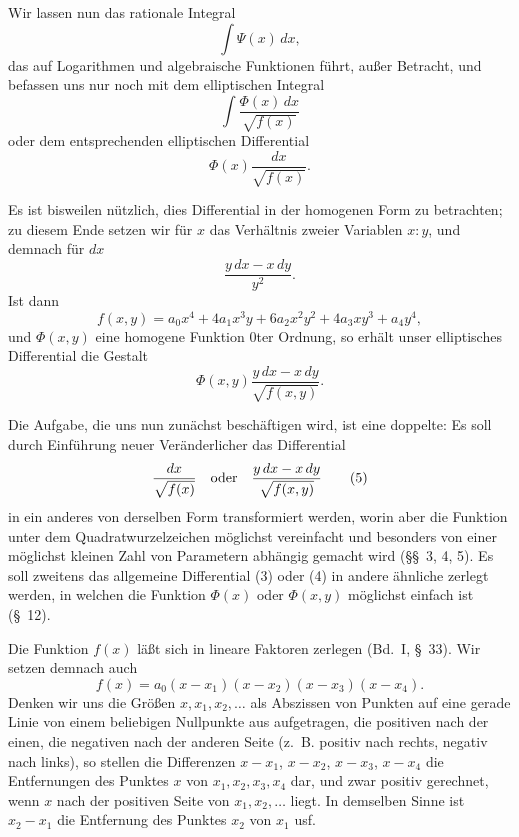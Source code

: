 \documentclass[11pt]{article}
\begin{document}
Wir lassen nun das rationale Integral
\[
\int \Psi(x)\,dx,
\]
das auf Logarithmen und algebraische Funktionen führt, außer Betracht, und befassen uns nur noch mit dem elliptischen Integral
\begin{equation}
\int \frac{\Phi(x)\,dx}{\sqrt{f(x)}}
\tag{2}
\end{equation}
oder dem entsprechenden elliptischen Differential
\begin{equation}
\Phi(x)\frac{dx}{\sqrt{f(x)}}.
\tag{3}
\end{equation}

Es ist bisweilen nützlich, dies Differential in der homogenen Form zu betrachten; zu diesem Ende setzen wir für $x$ das Verhältnis zweier Variablen $x:y$, und demnach für $dx$
\[
\frac{y\,dx-x\,dy}{y^2}.
\]
Ist dann
\[
f(x,y)=a_0x^4+4a_1x^3y+6a_2x^2y^2+4a_3xy^3+a_4y^4,
\]
und $\Phi(x,y)$ eine homogene Funktion $0$ter Ordnung, so erhält unser elliptisches Differential die Gestalt
\begin{equation}
\Phi(x,y)\frac{y\,dx-x\,dy}{\sqrt{f(x,y)}}.
\tag{4}
\end{equation}

Die Aufgabe, die uns nun zunächst beschäftigen wird, ist eine doppelte: Es soll durch Einführung neuer Veränderlicher das Differential
\begin{equation}
\frac{dx}{\sqrt{f(x)}}\quad\hbox{oder}\quad \frac{y\,dx-x\,dy}{\sqrt{f(x,y)}}
\tag{5}
\end{equation}
in ein anderes von derselben Form transformiert werden, worin aber die Funktion unter dem Quadratwurzelzeichen möglichst vereinfacht und besonders von einer möglichst kleinen Zahl von Parametern abhängig gemacht wird (\S\S~3, 4, 5). Es soll zweitens das allgemeine Differential (3) oder (4) in andere ähnliche zerlegt werden, in welchen die Funktion $\Phi(x)$ oder $\Phi(x,y)$ möglichst einfach ist (\S~12).

Die Funktion $f(x)$ läßt sich in lineare Faktoren zerlegen (Bd.~I, \S~33). Wir setzen demnach auch
\[
f(x)=a_0(x-x_1)(x-x_2)(x-x_3)(x-x_4).
\]
Denken wir uns die Größen $x,x_1,x_2,\ldots$ als Abszissen von Punkten auf eine gerade Linie von einem beliebigen Nullpunkte aus aufgetragen, die positiven nach der einen, die negativen nach der anderen Seite (z.~B. positiv nach rechts, negativ nach links), so stellen die Differenzen $x-x_1$, $x-x_2$, $x-x_3$, $x-x_4$ die Entfernungen des Punktes $x$ von $x_1,x_2,x_3,x_4$ dar, und zwar positiv gerechnet, wenn $x$ nach der positiven Seite von $x_1,x_2,\ldots$ liegt. In demselben Sinne ist $x_2-x_1$ die Entfernung des Punktes $x_2$ von $x_1$ usf.
\end{document}
